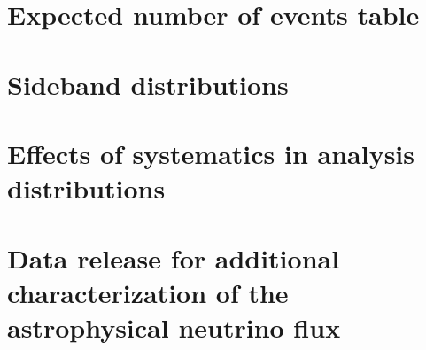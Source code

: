 \documentclass[oneside, letterpaper, 10pt, oldfontcommands]{memoir}
\begin{document}
\section{Expected number of events table\label{sec:events_table}}

\section{Sideband distributions\label{sec:sidebands}}

\section{Effects of systematics in analysis distributions\label{sec:extendedsys}}

\section{Data release for additional characterization of the astrophysical neutrino flux\label{sec:release}}

\endgroup
\end{document}
